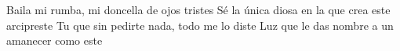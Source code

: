 
    Baila mi rumba, mi doncella de ojos tristes
    Sé la única diosa en la que crea este arcipreste
    Tu que sin pedirte nada, todo me lo diste
    Luz que le das nombre a un amanecer como este
\endverse
